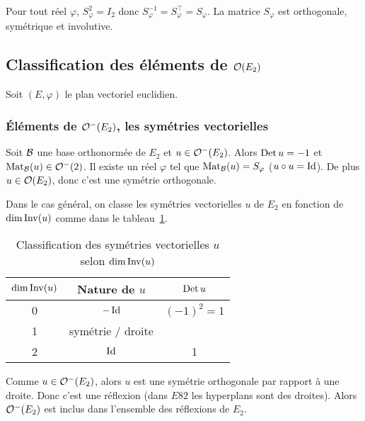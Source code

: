 \begin{corth}
  Pour tout réel \(\varphi\), \(S_\varphi^2=I_2\) donc \(S_\varphi^{-1}=S_\varphi^\top=S_\varphi\). La matrice \(S_\varphi\) est orthogonale, symétrique et involutive.
\end{corth}

\subsection{Classification des éléments de \(\mathcal{O}\!\left(E_2\right)\)}

Soit \((E,\varphi)\) le plan vectoriel euclidien.

\subsubsection{Éléments de \(\mathcal{O}^{-}\!\left(E_2\right)\), les symétries vectorielles}

Soit \(\mathcal{B}\) une base orthonormée de \(E_2\) et \(u \in \mathcal{O}^{-}\!\left(E_2\right)\). Alors \(\operatorname{Det} u=-1\) et \(\mathrm{Mat}_{\mathcal{B}}(u) \in \mathcal{O}^{-}\!\left(2\right)\). Il existe un réel \(\varphi\) tel que \(\mathrm{Mat}_{\mathcal{B}}(u)=S_\varphi\) (\(u \circ u=\operatorname{Id}\)). De plus \(u \in \mathcal{O}\!\left(E_2\right)\), donc c'est une symétrie orthogonale. 

Dans le cas général, on classe les symétries vectorielles \(u\) de \(E_2\) en fonction de \(\operatorname{dim} \operatorname{Inv}(u)\) comme dans le tableau~\ref{tab:SymVect}.

\begin{table}[!h]
  \centering
  \begin{tabular}{|c|c|c|}\hline
    \(\operatorname{dim}\operatorname{Inv}(u)\) & Nature de \(u\) & \(\operatorname{Det} u\) \\ \hline
    0 & \(-\operatorname{Id}\) & \((-1)^2=1\) \\
    1 & symétrie / droite & \\
    2 & \(\operatorname{Id}\) & 1 \\
    \hline
  \end{tabular}
  \caption{Classification des symétries vectorielles \(u\) selon \(\operatorname{dim}\operatorname{Inv}(u)\)}
  \label{tab:SymVect}
\end{table}

Comme \(u \in \mathcal{O}^{-}\!\left(E_2\right)\), alors \(u\) est une symétrie orthogonale par rapport à une droite. Donc c'est une réflexion (dans \(E82\) les hyperplans sont des droites). Alors \(\mathcal{O}^{-}\!\left(E_2\right)\) est inclus dans l'ensemble des réflexions de \(E_2\).

